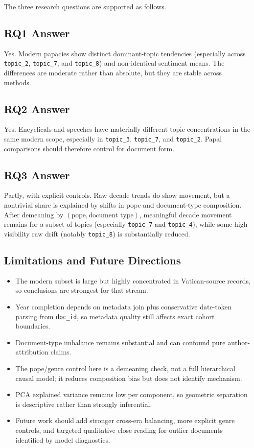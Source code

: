\documentclass[conference]{IEEEtran}
\begin{document}
The three research questions are supported as follows.

\subsection{RQ1 Answer}
Yes. Modern papacies show distinct dominant-topic tendencies (especially across \texttt{topic\_2}, \texttt{topic\_7}, and \texttt{topic\_8}) and non-identical sentiment means. The differences are moderate rather than absolute, but they are stable across methods.

\subsection{RQ2 Answer}
Yes. Encyclicals and speeches have materially different topic concentrations in the same modern scope, especially in \texttt{topic\_3}, \texttt{topic\_7}, and \texttt{topic\_2}. Papal comparisons should therefore control for document form.

\subsection{RQ3 Answer}
Partly, with explicit controls. Raw decade trends do show movement, but a nontrivial share is explained by shifts in pope and document-type composition. After demeaning by \((\text{pope},\text{document type})\), meaningful decade movement remains for a subset of topics (especially \texttt{topic\_7} and \texttt{topic\_4}), while some high-visibility raw drift (notably \texttt{topic\_8}) is substantially reduced.

\subsection{Limitations and Future Directions}
\begin{itemize}
\item The modern subset is large but highly concentrated in Vatican-source records, so conclusions are strongest for that stream.
\item Year completion depends on metadata join plus conservative date-token parsing from \texttt{doc\_id}, so metadata quality still affects exact cohort boundaries.
\item Document-type imbalance remains substantial and can confound pure author-attribution claims.
\item The pope/genre control here is a demeaning check, not a full hierarchical causal model; it reduces composition bias but does not identify mechanism.
\item PCA explained variance remains low per component, so geometric separation is descriptive rather than strongly inferential.
\item Future work should add stronger cross-era balancing, more explicit genre controls, and targeted qualitative close reading for outlier documents identified by model diagnostics.
\end{itemize}
\end{document}
